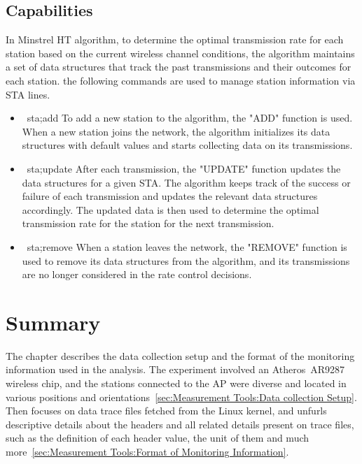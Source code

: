 \subsection{Capabilities}
\label{sta}
In Minstrel HT algorithm, to determine the optimal transmission rate for each station based on the current wireless channel conditions, the algorithm maintains a set of data structures that track the past transmissions and their outcomes for each station.
the following commands are used to manage station information via STA lines.
\begin{itemize}
\item \ sta;add  
To add a new station to the algorithm, the "ADD" function is used. When a new station joins the network, the algorithm initializes its data structures with default values and starts collecting data on its transmissions.
\item \ sta;update
After each transmission, the "UPDATE" function updates the data structures for a given STA. The algorithm keeps track of the success or failure of each transmission and updates the relevant data structures accordingly. The updated data is then used to determine the optimal transmission rate for the station for the next transmission.
\item \ sta;remove 
When a station leaves the network, the "REMOVE" function is used to remove its data structures from the algorithm, and its transmissions are no longer considered in the rate control decisions.
\end{itemize}
\newpage





\section{Summary}

The chapter describes the data collection setup and the format of the monitoring information used in the analysis. The experiment involved an Atheros~AR9287 wireless chip, and the stations connected to the AP were diverse and located in various positions and orientations~\ref{sec:Measurement Tools:Data collection Setup}. Then focuses on data trace files fetched from the Linux kernel, and unfurls descriptive details about the headers and all related details present on trace files, such as the definition of each header value, the unit of them and much more~\ref{sec:Measurement Tools:Format of Monitoring Information}.